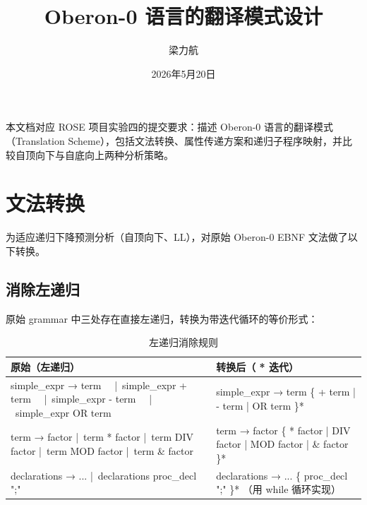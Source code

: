 \documentclass[12pt,a4paper,fontset=none]{ctexart}
\title{Oberon-0 语言的翻译模式设计}
\author{梁力航\quad 23336128}
\date{2026年5月20日}
\begin{document}
\hfuzz=20pt
\maketitle

\begin{plainBox}
本文档对应 ROSE 项目实验四的提交要求：描述 Oberon-0 语言的翻译模式（Translation Scheme），包括文法转换、属性传递方案和递归子程序映射，并比较自顶向下与自底向上两种分析策略。
\end{plainBox}

\section{文法转换}

为适应递归下降预测分析（自顶向下、LL），对原始 Oberon-0 EBNF 文法做了以下转换。

\subsection{消除左递归}

原始 grammar 中三处存在直接左递归，转换为带迭代循环的等价形式：

\begin{table}[H]\centering
\begin{tabularx}{\textwidth}{>{\ttfamily\small}Y>{\ttfamily\small}Y}
\toprule
\textbf{原始（左递归）} & \textbf{转换后（{ }* 迭代）} \\
\midrule
simple\_expr → term \newline
\quad\ \ |\ simple\_expr + term \newline
\quad\ \ |\ simple\_expr - term \newline
\quad\ \ |\ simple\_expr OR term & simple\_expr → term \{ + term | - term | OR term \}* \\
\midrule
term → factor \newline
\quad |\ term * factor \newline
\quad |\ term DIV factor \newline
\quad |\ term MOD factor \newline
\quad |\ term \& factor & term → factor \{ * factor | DIV factor | MOD factor | \& factor \}* \\
\midrule
declarations → ... \newline
\quad |\ declarations proc\_decl ";" & declarations → ... \{ proc\_decl ";" \}* \newline
\quad\quad（用 while 循环实现） \\
\bottomrule
\end{tabularx}
\caption{左递归消除规则}
\end{table}
\end{document}
